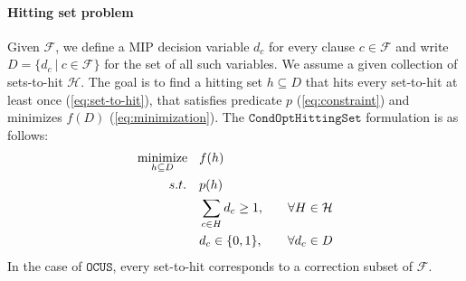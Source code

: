 \documentclass[twoside,11pt]{article}
\newcommand\m[1]{\mathcal{#1}}
\DeclareMathOperator*{\mini}{minimize}
\newcommand\comment[1]{\marginpar{\tiny #1}}
\renewcommand\comment[1]{#1}
\newcommand{\emilio}[1]{{\comment{\color{red}Emilio: #1}}}
\newcommand{\bart}[1]{{\comment{\color{OliveGreen}Bart: #1}}}
\newcommand\setstohit{\ensuremath{\m{H} }\xspace}
\newcommand\decisionvariables{{D}}
\newcommand\decisionvariable{{d}}
\newcommand\settohit{H}
\newcommand\hittingset{h}
\newcommand\formula{\ensuremath{\m{F} }\xspace}
\newcommand\mm[1]{\ensuremath{#1}\xspace}
\newcommand\call[1]{\mm{\texttt{#1}}}
\newcommand\cohs{\mm{\call{CondOptHittingSet}}}
\newcommand\comus{\mm{\call{OCUS}}}
\begin{document}
\paragraph{Hitting set problem} Given $\formula$, we define a MIP decision variable $d_c$ for every clause $c\in \formula$ and write  $\decisionvariables = \{d_c \ | \ c \in \formula\}$ for the set of all such variables. We assume a given collection of sets-to-hit $\setstohit$.
The goal is to find a hitting set $\hittingset \subseteq D$ that hits every set-to-hit at least once (\cref{eq:set-to-hit}), that satisfies predicate $p$ (\cref{eq:constraint}) and minimizes $f(D)$ (\cref{eq:minimization}).
The \cohs formulation is as follows:
\begin{align}
\small
\mini_{{\hittingset \subseteq \decisionvariables}} \quad & f(\hittingset) \label{eq:minimization}\\ 
s.t. \quad & p(\hittingset) \label{eq:constraint}\\
  & \sum_{c\in \settohit}\decisionvariable_c \geq 1, \quad & \forall \settohit \in \setstohit \label{eq:set-to-hit}\\
  & \decisionvariable_c \in \{0,1\}, \quad  & \forall \decisionvariable_c \in \decisionvariables     \label{eq:decision-variables}
\end{align}
In the case of \comus, every set-to-hit corresponds to a correction subset of $\formula$. %
\end{document}
